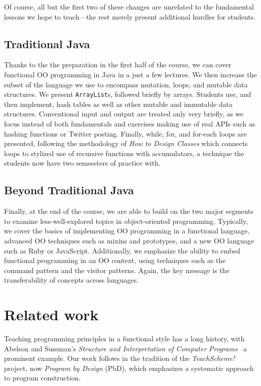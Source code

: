 \documentclass[submission,copyright]{eptcs}
\def\htdc{\emph{How to Design Classes}\xspace}
\begin{document}
Of course, all but the first two of these changes are unrelated to the
fundamental lessons we hope to teach---the rest merely present
additional hurdles for students.

\subsection{Traditional Java}

Thanks to the the preparation in the first half of the course, we can
cover functional OO programming in Java in a just a few lectures.  We
then increase the subset of the language we use to encompass mutation,
loops, and mutable data structures. We present \texttt{ArrayList}s,
followed briefly by arrays. Students use, and then implement, hash
tables as well as other mutable and immutable data structures.
Conventional input and output are treated only very briefly, as we
focus instead of both fundamentals and exercises making use of real
APIs such as hashing functions or Twitter posting.  Finally, while,
for, and for-each loops are presented, following the methodology of
\htdc which connects loops to stylized use of recursive functions with
accumulators, a technique the students now have two semsesters of
practice with.

\subsection{Beyond Traditional Java}

Finally, at the end of the course, we are able to build on the two
major segments to examine less-well-explored topics in object-oriented
programming.  Typically, we cover the basics of implementing OO
programming in a functional language, advanced OO techniques such as
mixins and prototypes, and a new OO language such as Ruby or
JavaScript.  Additionally, we emphasize the ability to embed
functional programming in an OO context, using techniques such as the
command pattern and the visitor patterns.  Again, the key message is
the transferability of concepts across languages. 



\section{Related work}
\label{sec:related-work}

Teaching programming principles in a functional style has a long
history, with Abelson and Sussman's \emph{Structure and Interpretation
of Computer Programs}~\cite{dvanhorn:sicp} a prominent example.  Our
work follows in the tradition of the \emph{TeachScheme!} project, now
\emph{Program by Design} (PbD), which emphasizes a systematic
approach to program construction.  
\end{document}
